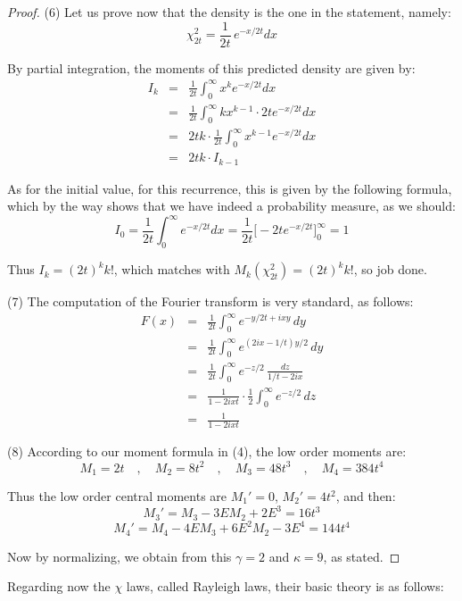 \documentclass[12pt]{amsbook}
\begin{document}
\begin{proof}
(6) Let us prove now that the density is the one in the statement, namely:
$$\chi_{2t}^2=\frac{1}{2t}\,e^{-x/2t}dx$$

By partial integration, the moments of this predicted density are given by:
\begin{eqnarray*}
I_k
&=&\frac{1}{2t}\int_0^\infty x^ke^{-x/2t}dx\\
&=&\frac{1}{2t}\int_0^\infty kx^{k-1}\cdot 2te^{-x/2t}dx\\
&=&2tk\cdot\frac{1}{2t}\int_0^\infty x^{k-1}e^{-x/2t}dx\\
&=&2tk\cdot I_{k-1}
\end{eqnarray*}

As for the initial value, for this recurrence, this is given by the following formula, which by the way shows that we have indeed a probability measure, as we should:
$$I_0
=\frac{1}{2t}\int_0^\infty e^{-x/2t}dx
=\frac{1}{2t}\Big[-2te^{-x/2t}\Big]_0^\infty
=1$$

Thus $I_k=(2t)^kk!$, which matches with $M_k(\chi_{2t}^2)=(2t)^kk!$, so job done.

\medskip

(7) The computation of the Fourier transform is very standard, as follows:
\begin{eqnarray*}
F(x)
&=&\frac{1}{2t}\int_0^\infty e^{-y/2t+ixy}\,dy\\
&=&\frac{1}{2t}\int_0^\infty e^{(2ix-1/t)y/2}\,dy\\
&=&\frac{1}{2t}\int_0^\infty e^{-z/2}\,\frac{dz}{1/t-2ix}\\
&=&\frac{1}{1-2ixt}\cdot\frac{1}{2}\int_0^\infty e^{-z/2}\,dz\\
&=&\frac{1}{1-2ixt}
\end{eqnarray*}

(8) According to our moment formula in (4), the low order moments are:
$$M_1=2t\quad,\quad 
M_2=8t^2\quad,\quad 
M_3=48t^3\quad,\quad 
M_4=384t^4$$

Thus the low order central moments are $M_1'=0$, $M_2'=4t^2$, and then:
$$M_3'=M_3-3EM_2+2E^3=16t^3$$
$$M_4'=M_4-4EM_3+6E^2M_2-3E^4=144t^4$$

Now by normalizing, we obtain from this $\gamma=2$ and $\kappa=9$, as stated. 
\end{proof}

Regarding now the $\chi$ laws, called Rayleigh laws, their basic theory is as follows:

\end{document}
